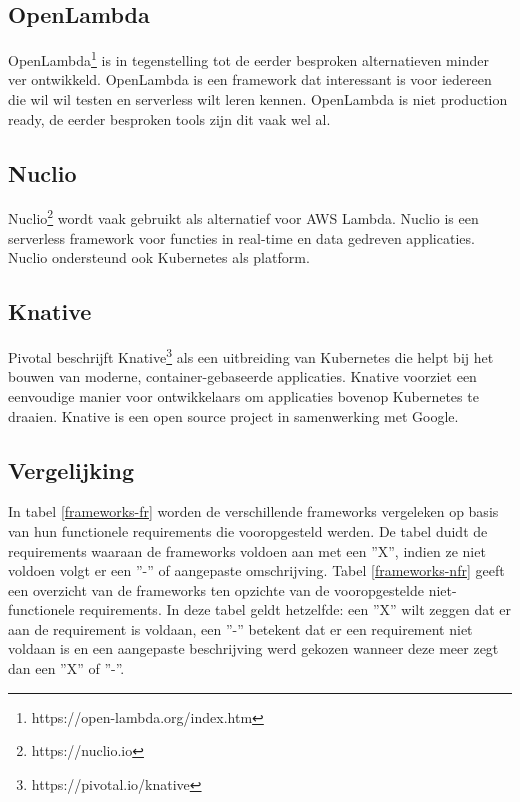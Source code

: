 \subsection{OpenLambda}
OpenLambda\footnote{https://open-lambda.org/index.htm} is in tegenstelling tot de eerder besproken alternatieven minder ver ontwikkeld. OpenLambda is een framework dat interessant is voor iedereen die wil wil testen en serverless wilt leren kennen. OpenLambda is niet production ready, de eerder besproken tools zijn dit vaak wel al.

\subsection{Nuclio}
Nuclio\footnote{https://nuclio.io} wordt vaak gebruikt als alternatief voor AWS Lambda. Nuclio is een serverless framework voor functies in real-time en data gedreven applicaties. Nuclio ondersteund ook Kubernetes als platform. \autocite{Nuclio2019}

\subsection{Knative}
Pivotal beschrijft Knative\footnote{https://pivotal.io/knative} als een uitbreiding van Kubernetes die helpt bij het bouwen van moderne, container-gebaseerde applicaties. Knative voorziet een eenvoudige manier voor ontwikkelaars om applicaties bovenop Kubernetes te draaien. Knative is een open source project in samenwerking met Google.

\subsection{Vergelijking}
In tabel \ref{frameworks-fr} worden de verschillende frameworks vergeleken op basis van hun functionele requirements die vooropgesteld  werden.  De tabel duidt de requirements waaraan de frameworks voldoen aan met een ''X'', indien ze niet voldoen volgt er een ''-'' of aangepaste omschrijving. Tabel \ref{frameworks-nfr} geeft een overzicht van de frameworks ten opzichte van de vooropgestelde niet-functionele requirements. In deze tabel geldt hetzelfde: een ''X'' wilt zeggen dat er aan de requirement is voldaan, een ''-'' betekent dat er een requirement niet voldaan is en een aangepaste beschrijving werd gekozen wanneer deze meer zegt dan een ''X'' of ''-''.


